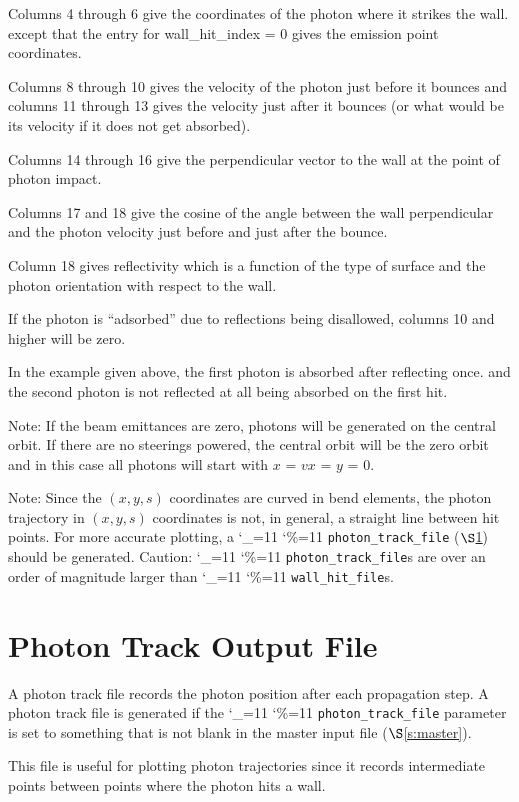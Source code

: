 \documentclass[11pt,openany]{report}
\newcommand{\sref}[1]{$\S$\ref{#1}}
\newcommand\ttcmd{\begingroup\catcode`\_=11 \catcode`\%=11 \dottcmd}
\newcommand\dottcmd[1]{\texttt{#1}\endgroup}
\newcommand{\vn}{\ttcmd}
\begin{document}
{{Columns 4 through 6 give the coordinates of the photon where it strikes the wall.  except
that the entry for wall_hit_index = 0 gives the emission point coordinates.

Columns 8 through 10 gives the velocity of the photon just before it bounces and columns 11
through 13 gives the velocity just after it bounces (or what would be its velocity if it
does not get absorbed).

Columns 14 through 16 give the perpendicular vector to the wall at the point of photon
impact.

Columns 17 and 18 give the cosine of the angle between the wall perpendicular and the
photon velocity just before and just after the bounce.

Column 18 gives reflectivity which is a function of the type of surface and the photon
orientation with respect to the wall.

If the photon is ``adsorbed'' due to reflections being disallowed, columns 10 and
higher will be zero.

In the example given above, the first photon is absorbed after reflecting once.
and the second photon is not reflected at all being absorbed on the first hit.

Note: If the beam emittances are zero, photons will be generated on
the central orbit. If there are no steerings powered, the central
orbit will be the zero orbit and in this case all photons will start
with $x$ = $vx$ = $y$ = 0.

Note: Since the $(x,y,s)$ coordinates are curved in bend elements, the photon trajectory
in $(x,y,s)$ coordinates is not, in general, a straight line between hit points. For more
accurate plotting, a \vn{photon_track_file} (\sref{s:photon.track.file}) should be
generated. Caution: \vn{photon_track_file}s are over an order of magnitude larger than
\vn{wall_hit_file}s.

\section{Photon Track Output File}
\label{s:photon.track.file}

A photon track file records the photon position after each propagation step.  A photon
track file is generated if the \vn{photon_track_file} parameter is set to something that
is not blank in the master input file (\sref{s:master}). 

This file is useful for plotting photon trajectories since it records intermediate points
between points where the photon hits a wall.

}}
\end{document}
